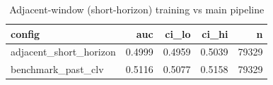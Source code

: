 \begin{table}
\caption{Adjacent-window (short-horizon) training vs main pipeline}
\label{tab:adjacent}
\begin{tabular}{lrrrr}
\toprule
config & auc & ci_lo & ci_hi & n \\
\midrule
adjacent_short_horizon & 0.4999 & 0.4959 & 0.5039 & 79329 \\
benchmark_past_clv & 0.5116 & 0.5077 & 0.5158 & 79329 \\
\bottomrule
\end{tabular}
\end{table}
